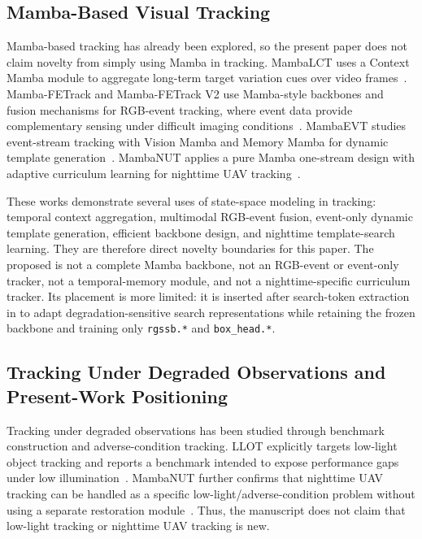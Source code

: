 \subsection{Mamba-Based Visual Tracking}
Mamba-based tracking has already been explored, so the present paper does not claim novelty from simply using Mamba in tracking. MambaLCT uses a Context Mamba module to aggregate long-term target variation cues over video frames~\cite{li2024mambalct}. Mamba-FETrack and Mamba-FETrack V2 use Mamba-style backbones and fusion mechanisms for RGB-event tracking, where event data provide complementary sensing under difficult imaging conditions~\cite{huang2024mambafetrack,wang2025mambafetrackv2}. MambaEVT studies event-stream tracking with Vision Mamba and Memory Mamba for dynamic template generation~\cite{wang2024mambaevt}. MambaNUT applies a pure Mamba one-stream design with adaptive curriculum learning for nighttime UAV tracking~\cite{wu2024mambanut}.

These works demonstrate several uses of state-space modeling in tracking: temporal context aggregation, multimodal RGB-event fusion, event-only dynamic template generation, efficient backbone design, and nighttime template-search learning. They are therefore direct novelty boundaries for this paper. The proposed \method{} is not a complete Mamba backbone, not an RGB-event or event-only tracker, not a temporal-memory module, and not a nighttime-specific curriculum tracker. Its placement is more limited: it is inserted after search-token extraction in \baseline{} to adapt degradation-sensitive search representations while retaining the frozen backbone and training only \texttt{rgssb.*} and \texttt{box\_head.*}.

\subsection{Tracking Under Degraded Observations and Present-Work Positioning}
Tracking under degraded observations has been studied through benchmark construction and adverse-condition tracking. LLOT explicitly targets low-light object tracking and reports a benchmark intended to expose performance gaps under low illumination~\cite{zhong2024llot}. MambaNUT further confirms that nighttime UAV tracking can be handled as a specific low-light/adverse-condition problem without using a separate restoration module~\cite{wu2024mambanut}. Thus, the manuscript does not claim that low-light tracking or nighttime UAV tracking is new.

